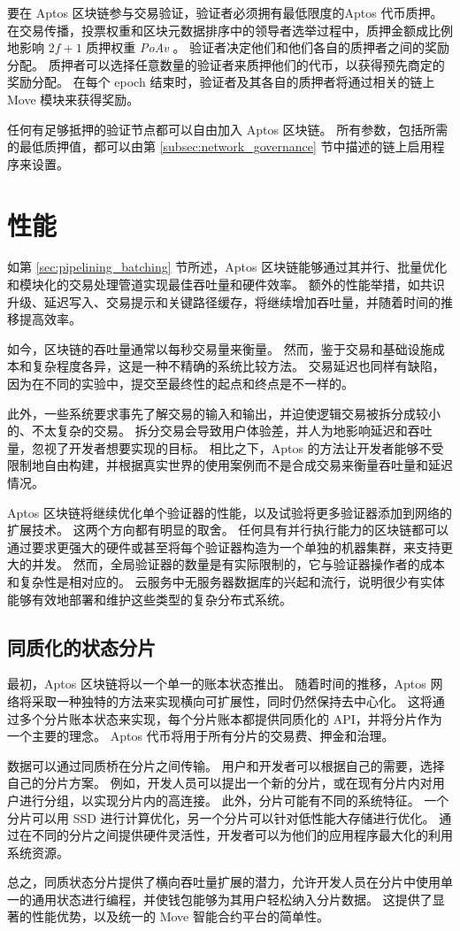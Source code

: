 \documentclass{article}
\begin{document}
要在 Aptos 区块链参与交易验证，验证者必须拥有最低限度的Aptos 代币质押。 在交易传播，投票权重和区块元数据排序中的领导者选举过程中，质押金额成比例地影响 $2f+1$ 质押权重 \emph{PoAv} 。 验证者决定他们和他们各自的质押者之间的奖励分配。 质押者可以选择任意数量的验证者来质押他们的代币，以获得预先商定的奖励分配。 在每个 epoch 结束时，验证者及其各自的质押者将通过相关的链上 Move 模块来获得奖励。

任何有足够抵押的验证节点都可以自由加入 Aptos 区块链。 所有参数，包括所需的最低质押值，都可以由第 \ref{subsec:network_governance} 节中描述的链上启用程序来设置。


\section{性能}
\label{sec:performance}
如第 \ref{sec:pipelining_batching} 节所述，Aptos 区块链能够通过其并行、批量优化和模块化的交易处理管道实现最佳吞吐量和硬件效率。 额外的性能举措，如共识升级、延迟写入、交易提示和关键路径缓存，将继续增加吞吐量，并随着时间的推移提高效率。

如今，区块链的吞吐量通常以每秒交易量来衡量。 然而，鉴于交易和基础设施成本和复杂程度各异，这是一种不精确的系统比较方法。 交易延迟也同样有缺陷，因为在不同的实验中，提交至最终性的起点和终点是不一样的。

此外，一些系统要求事先了解交易的输入和输出，并迫使逻辑交易被拆分成较小的、不太复杂的交易。 拆分交易会导致用户体验差，并人为地影响延迟和吞吐量，忽视了开发者想要实现的目标。 相比之下，Aptos 的方法让开发者能够不受限制地自由构建，并根据真实世界的使用案例而不是合成交易来衡量吞吐量和延迟情况。

Aptos 区块链将继续优化单个验证器的性能，以及试验将更多验证器添加到网络的扩展技术。 这两个方向都有明显的取舍。 任何具有并行执行能力的区块链都可以通过要求更强大的硬件或甚至将每个验证器构造为一个单独的机器集群，来支持更大的并发。 然而，全局验证器的数量是有实际限制的，它与验证器操作者的成本和复杂性是相对应的。 云服务中无服务器数据库的兴起和流行，说明很少有实体能够有效地部署和维护这些类型的复杂分布式系统。


\subsection{同质化的状态分片}

最初，Aptos 区块链将以一个单一的账本状态推出。 随着时间的推移，Aptos 网络将采取一种独特的方法来实现横向可扩展性，同时仍然保持去中心化。 这将通过多个分片账本状态来实现，每个分片账本都提供同质化的 API，并将分片作为一个主要的理念。 Aptos 代币将用于所有分片的交易费、押金和治理。

数据可以通过同质桥在分片之间传输。 用户和开发者可以根据自己的需要，选择自己的分片方案。 例如，开发人员可以提出一个新的分片，或在现有分片内对用户进行分组，以实现分片内的高连接。 此外，分片可能有不同的系统特征。 一个分片可以用 SSD 进行计算优化，另一个分片可以针对低性能大存储进行优化。 通过在不同的分片之间提供硬件灵活性，开发者可以为他们的应用程序最大化的利用系统资源。

总之，同质状态分片提供了横向吞吐量扩展的潜力，允许开发人员在分片中使用单一的通用状态进行编程，并使钱包能够为其用户轻松纳入分片数据。 这提供了显著的性能优势，以及统一的 Move 智能合约平台的简单性。



\small{

}
\end{document}
